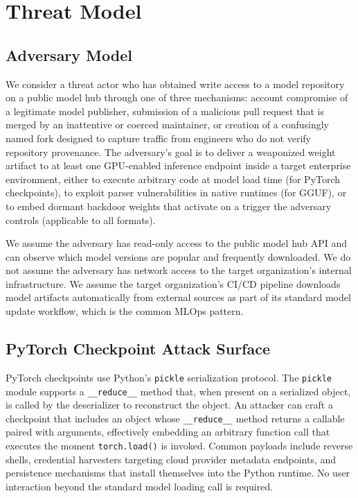 \documentclass[sigconf,review]{acmart}
\begin{document}
\section{Threat Model}
\label{sec:threat}

\subsection{Adversary Model}

We consider a threat actor who has obtained write access to a model
repository on a public model hub through one of three mechanisms: account
compromise of a legitimate model publisher, submission of a malicious pull
request that is merged by an inattentive or coerced maintainer, or creation
of a confusingly named fork designed to capture traffic from engineers who
do not verify repository provenance. The adversary's goal is to deliver a
weaponized weight artifact to at least one GPU-enabled inference endpoint
inside a target enterprise environment, either to execute arbitrary code at
model load time (for PyTorch checkpoints), to exploit parser vulnerabilities
in native runtimes (for GGUF), or to embed dormant backdoor weights that
activate on a trigger the adversary controls (applicable to all formats).

We assume the adversary has read-only access to the public model hub API
and can observe which model versions are popular and frequently downloaded.
We do not assume the adversary has network access to the target organization's
internal infrastructure. We assume the target organization's CI/CD pipeline
downloads model artifacts automatically from external sources as part of its
standard model update workflow, which is the common MLOps pattern.

\subsection{PyTorch Checkpoint Attack Surface}

PyTorch checkpoints use Python's \texttt{pickle} serialization protocol.
The \texttt{pickle} module supports a \texttt{\_\_reduce\_\_} method that,
when present on a serialized object, is called by the deserializer to
reconstruct the object. An attacker can craft a checkpoint that includes an
object whose \texttt{\_\_reduce\_\_} method returns a callable paired with
arguments, effectively embedding an arbitrary function call that executes
the moment \texttt{torch.load()} is invoked. Common payloads include reverse
shells, credential harvesters targeting cloud provider metadata endpoints,
and persistence mechanisms that install themselves into the Python runtime.
No user interaction beyond the standard model loading call is required.
\end{document}
